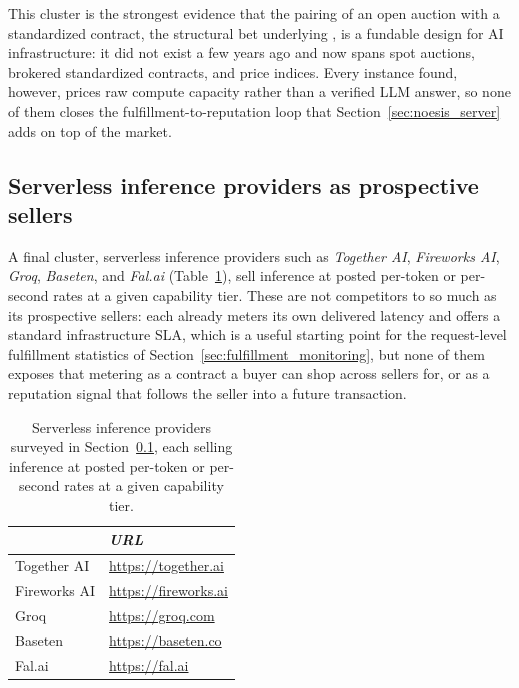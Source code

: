 This cluster is the strongest evidence that the pairing of an open auction with
a standardized contract, the structural bet underlying \NoesisMarket, is a
fundable design for AI infrastructure: it did not exist a few years ago and now
spans spot auctions, brokered standardized contracts, and price indices. Every
instance found, however, prices raw compute capacity rather than a verified LLM
answer, so none of them closes the fulfillment-to-reputation loop that
Section~\ref{sec:noesis_server} adds on top of the market.

\subsection{Serverless inference providers as prospective sellers}
\label{sec:sota_sellers}

A final cluster, serverless inference providers such as \emph{Together AI},
\emph{Fireworks AI}, \emph{Groq}, \emph{Baseten}, and \emph{Fal.ai}
(Table~\ref{tab:sota_sellers_companies}),
sell inference at posted per-token or per-second rates at a given
capability tier. These are not competitors to \Noesis{} so much as its
prospective sellers: each already meters its own delivered latency and
offers a standard infrastructure SLA, which is a useful starting point for
the request-level fulfillment statistics of
Section~\ref{sec:fulfillment_monitoring}, but none of them exposes that
metering as a contract a buyer can shop across sellers for, or as a
reputation signal that follows the seller into a future transaction.

\begin{samepage}
  \begin{table}[H]
    \centering
    \footnotesize
    \begin{tabular}{l|l|}
                & \emph{URL} \\
      \hline
      Together AI  & \url{https://together.ai} \\
      \hline
      Fireworks AI & \url{https://fireworks.ai} \\
      \hline
      Groq         & \url{https://groq.com} \\
      \hline
      Baseten      & \url{https://baseten.co} \\
      \hline
      Fal.ai       & \url{https://fal.ai} \\
      \hline
    \end{tabular}
    \caption{Serverless inference providers surveyed in
      Section~\ref{sec:sota_sellers}, each selling inference at posted
      per-token or per-second rates at a given capability tier.}
    \label{tab:sota_sellers_companies}
  \end{table}
\end{samepage}

